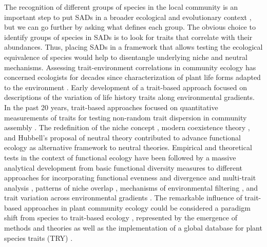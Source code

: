\documentclass[12pt]{article}
\begin{document}
The recognition of different groups of species in the local community is an important step to put SADs in a broader ecological and evolutionary context \citep{McGill2007, Swenson2012}, but we can go further by asking what defines each group. The obvious choice to identify groups of species in SADs is to look for traits that correlate with their abundances.  Thus, placing SADs in a framework that allows testing the ecological equivalence of species would help to disentangle underlying niche and neutral mechanisms. Assessing trait-environment correlations in community ecology has concerned ecologists for decades since \cite{Raunkiaer1934} characterization of plant life forms adapted to the environment \citep[see also][]{Grime1977, Connell1978}. Early development of a trait-based approach focused on descriptions of the variation of life history traits along environmental gradients. In the past 20 years, trait-based approaches focused on quantitative measurements of traits for testing non-random trait dispersion in community assembly
\citep{Swenson2012}. The redefinition of the niche concept \citep{Chase2003},
modern coexistence theory \citep{Chesson2000}, and Hubbell's proposal of neutral theory \citep{Hubbell2001} contributed to
advance functional ecology as alternative framework to neutral theories. 
Empirical and theoretical tests in the context of functional ecology have been followed by a massive analytical development \citep{Kraft2010} from basic functional diversity measures
\citep{Petchey2002a, Petchey2007} to different approaches for incorporating functional evenness and divergence \citep{Mason2005, Pavoine2009} and multi-trait analysis \citep{Laliberte2010}, patterns of niche overlap \citep{Mason2008}, mechanisms of environmental filtering \citep{Kraft2007, Mayfield2009}, and trait
variation across environmental gradients \citep{shipley2006plant, cornwell2009community, messier2010traits}. 
The remarkable influence of trait-based approaches in plant community ecology could be considered a paradigm shift from species to trait-based ecology \citep{Pavoine2011, Swenson2012}, represented by the emergence of methods and theories as well as the implementation of a global database for plant species traits (TRY) \citep{Kattage2011}.
\end{document}

